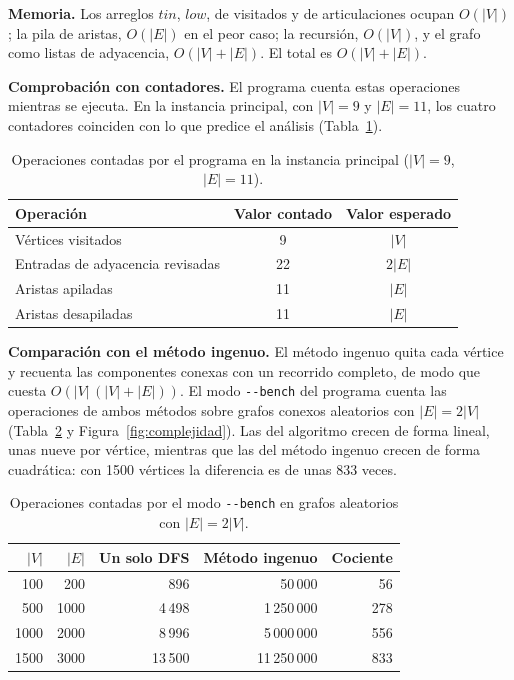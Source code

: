 \documentclass[11pt,a4paper]{article}
\numberwithin{equation}{section}
\newcommand{\tin}{\mathit{tin}}
\newcommand{\low}{\mathit{low}}
\begin{document}
\textbf{Memoria.} Los arreglos $\tin$, $\low$, de visitados y de articulaciones ocupan $O(|V|)$; la pila de aristas, $O(|E|)$ en el peor caso; la recursión, $O(|V|)$, y el grafo como listas de adyacencia, $O(|V|+|E|)$. El total es $O(|V|+|E|)$.

\textbf{Comprobación con contadores.} El programa cuenta estas operaciones mientras se ejecuta. En la instancia principal, con $|V|=9$ y $|E|=11$, los cuatro contadores coinciden con lo que predice el análisis (Tabla~\ref{tab:contadores}).

\begin{table}[H]
\centering
\caption{Operaciones contadas por el programa en la instancia principal ($|V|=9$, $|E|=11$).}
\label{tab:contadores}
\small
\begin{tabular}{l c c}
\toprule
\textbf{Operación} & \textbf{Valor contado} & \textbf{Valor esperado} \\
\midrule
Vértices visitados              & 9  & $|V|$ \\
Entradas de adyacencia revisadas & 22 & $2|E|$ \\
Aristas apiladas                & 11 & $|E|$ \\
Aristas desapiladas             & 11 & $|E|$ \\
\bottomrule
\end{tabular}
\end{table}

\textbf{Comparación con el método ingenuo.} El método ingenuo quita cada vértice y recuenta las componentes conexas con un recorrido completo, de modo que cuesta $O(|V|\,(|V|+|E|))$. El modo \texttt{-{}-bench} del programa cuenta las operaciones de ambos métodos sobre grafos conexos aleatorios con $|E|=2|V|$ (Tabla~\ref{tab:bench} y Figura~\ref{fig:complejidad}). Las del algoritmo crecen de forma lineal, unas nueve por vértice, mientras que las del método ingenuo crecen de forma cuadrática: con 1500 vértices la diferencia es de unas 833 veces.

\begin{table}[H]
\centering
\caption{Operaciones contadas por el modo \texttt{-{}-bench} en grafos aleatorios con $|E|=2|V|$.}
\label{tab:bench}
\small
\begin{tabular}{r r r r r}
\toprule
$|V|$ & $|E|$ & \textbf{Un solo DFS} & \textbf{Método ingenuo} & \textbf{Cociente} \\
\midrule
100  & 200  & 896     & 50\,000      & 56 \\
500  & 1000 & 4\,498  & 1\,250\,000  & 278 \\
1000 & 2000 & 8\,996  & 5\,000\,000  & 556 \\
1500 & 3000 & 13\,500 & 11\,250\,000 & 833 \\
\bottomrule
\end{tabular}
\end{table}
\end{document}
